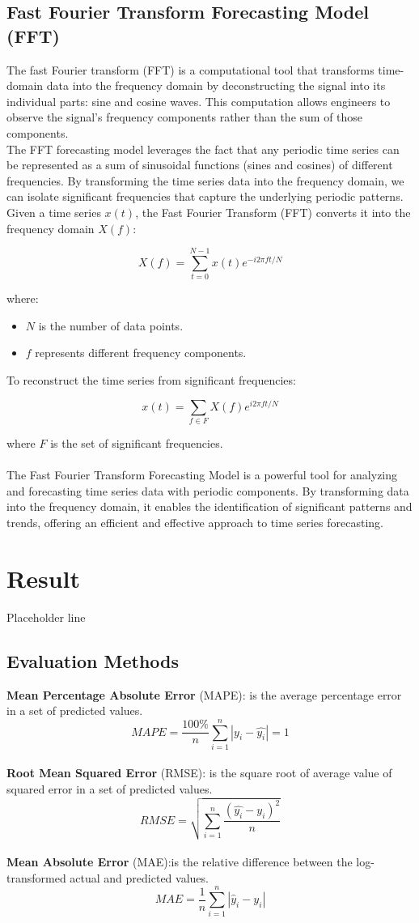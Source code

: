 \documentclass{ieeeojies}
\begin{document}
  \subsection{Fast Fourier Transform Forecasting Model (FFT)}
  The fast Fourier transform (FFT) is a computational tool that transforms time-domain data into the frequency domain by deconstructing the signal into its individual parts: sine and cosine waves. This computation allows engineers to observe the signal’s frequency components rather than the sum of those components.
  \\ 
  The FFT forecasting model leverages the fact that any periodic time series can be represented as a sum of sinusoidal functions (sines and cosines) of different frequencies. By transforming the time series data into the frequency domain, we can isolate significant frequencies that capture the underlying periodic patterns.
 \\
 Given a time series \( x(t) \), the Fast Fourier Transform (FFT) converts it into the frequency domain \( X(f) \):

\[
X(f) = \sum_{t=0}^{N-1} x(t) e^{-i 2\pi ft / N}
\]

where:
\begin{itemize}
    \item \( N \) is the number of data points.
    \item \( f \) represents different frequency components.
\end{itemize}
To reconstruct the time series from significant frequencies:

\[
x(t) = \sum_{f \in F} X(f) e^{i 2\pi ft / N}
\]

where \( F \) is the set of significant frequencies.
\\\\
The Fast Fourier Transform Forecasting Model is a powerful tool for analyzing and forecasting time series data with periodic components. By transforming data into the frequency domain, it enables the identification of significant patterns and trends, offering an efficient and effective approach to time series forecasting.
\section{Result}
Placeholder line
\subsection{Evaluation Methods}
\textbf{Mean Percentage Absolute Error} (MAPE): is the average percentage error in a set of predicted values.\\
\[MAPE=\frac{100\%}{n}  \sum_{i=1}^{n} |y_i-\hat{y_i} |  = 1 \]\\
\textbf{Root Mean Squared Error} (RMSE): is the square root of average value of squared error in a set of predicted values.\\
\[RMSE=\sqrt{\sum_{i=1}^{n} \frac{(\hat{y_i}-y_i )^2}{n} }\]\\
\textbf{Mean Absolute Error} (MAE):is the relative difference between the log-transformed actual and predicted values.\\
\[
MAE = \frac{1}{n} \sum_{i=1}^{n} \left| \hat{y}_i - y_i \right|
\]
\end{document}
